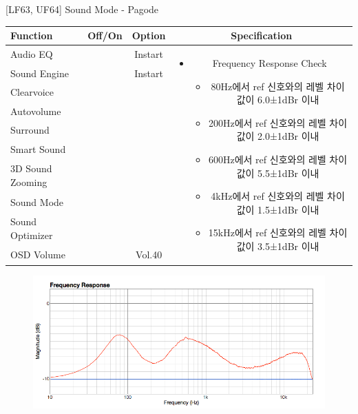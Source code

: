 \begin{frame}[t]{[LF63, UF64] Sound Mode - Pagode}
\begin{tiny}
\begin{tabular}{@{}lccc@{}}
\toprule
Function & Off/On & Option & Specification \\
\midrule
Audio EQ & \color{black}{Off} & Instart &
\multirow{10}{60mm}{
\begin{itemize}
\item Frequency Response Check
	\begin{itemize}
	\item 80Hz에서 ref 신호와의 레벨 차이값이 6.0±1dBr 이내
	\item 200Hz에서 ref 신호와의 레벨 차이값이 2.0±1dBr 이내
	\item 600Hz에서 ref 신호와의 레벨 차이값이 5.5±1dBr 이내
	\item 4kHz에서 ref 신호와의 레벨 차이값이 1.5±1dBr 이내
	\item 15kHz에서 ref 신호와의 레벨 차이값이 3.5±1dBr 이내
	\end{itemize}
\end{itemize}
} \\
Sound Engine & \color{blue}{On} & Instart & \\
Clearvoice & \color{black}{Off} & & \\
Autovolume & \color{black}{Off} & & \\
Surround & \color{black}{Off} & & \\
Smart Sound & \color{black}{Off} & & \\
3D Sound Zooming & \color{black}{Off} & & \\
Sound Mode & \color{blue}{On} & \color{blue}{Pagode} & \\
Sound Optimizer & \color{black}{Off} & & \\
OSD Volume & \color{blue}{On} & Vol.40 & \\
\midrule
\end{tabular}
\end{tiny}

\begin{figure}[b]
\includegraphics[height=0.4\textwidth]{figures/pagode.png}
\end{figure}

\end{frame}


